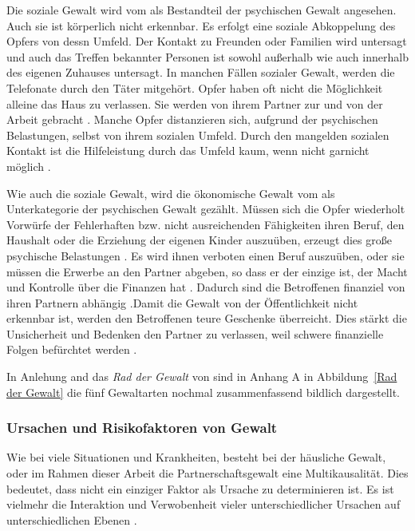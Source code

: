 Die soziale Gewalt wird vom \textcite{Def_Form_Folge_Gewalt} als Bestandteil der psychischen Gewalt angesehen. Auch sie ist körperlich nicht erkennbar. Es erfolgt eine soziale Abkoppelung des Opfers von dessn Umfeld. Der Kontakt zu Freunden oder Familien wird untersagt und auch das Treffen bekannter Personen ist sowohl außerhalb wie auch innerhalb des eigenen Zuhauses untersagt. In manchen Fällen sozialer Gewalt, werden die Telefonate durch den Täter mitgehört. Opfer haben oft nicht die Möglichkeit alleine das Haus zu verlassen. Sie werden von ihrem Partner zur und von der Arbeit gebracht \parencite{Def_haus_Gewalt_2, Def_Form_Folge_Gewalt}. Manche Opfer distanzieren sich, aufgrund der psychischen Belastungen, selbst von ihrem sozialen Umfeld. Durch den mangelden sozialen Kontakt ist die Hilfeleistung durch das Umfeld kaum, wenn nicht garnicht möglich \parencite{Def_haus_Gewalt_2}.

Wie auch die soziale Gewalt, wird die ökonomische Gewalt vom \textcite{Def_Form_Folge_Gewalt} als Unterkategorie der psychischen Gewalt gezählt. Müssen sich die Opfer wiederholt Vorwürfe der Fehlerhaften bzw. nicht ausreichenden Fähigkeiten ihren Beruf, den Haushalt oder die Erziehung der eigenen Kinder auszuüben, erzeugt dies große psychische Belastungen \parencite{Def_haus_Gewalt_2}. Es wird ihnen verboten einen Beruf auszuüben, oder sie müssen die Erwerbe an den Partner abgeben, so dass er der einzige ist, der Macht und Kontrolle über die Finanzen hat \parencite{Def_haus_Gewalt_2, Def_Form_Folge_Gewalt}. Dadurch sind die Betroffenen finanziel von ihren Partnern abhängig \parencite{physische_Gewalt_wie_aggro}.Damit die Gewalt von der Öffentlichkeit nicht erkennbar ist, werden den Betroffenen teure Geschenke überreicht. Dies stärkt die Unsicherheit und Bedenken den Partner zu verlassen, weil schwere finanzielle Folgen befürchtet werden \parencite{Übergang_psy_zu_sex_Gewalt}.

In Anlehung and das \textit{Rad der Gewalt} von \textcite{Rad_der_Gewalt} sind in Anhang A in Abbildung~\ref{Rad der Gewalt} die fünf Gewaltarten nochmal zusammenfassend bildlich dargestellt. %

\subsubsection{Ursachen und Risikofaktoren von Gewalt}     \label{2.1.2.2}
Wie bei viele Situationen und Krankheiten, besteht bei der häusliche Gewalt, oder im Rahmen dieser Arbeit die Partnerschaftsgewalt eine Multikausalität. Dies bedeutet, dass nicht ein einziger Faktor als Ursache zu determinieren ist. Es ist vielmehr die Interaktion und Verwobenheit vieler unterschiedlicher Ursachen auf unterschiedlichen Ebenen \parencite{Ursache_hG}.






